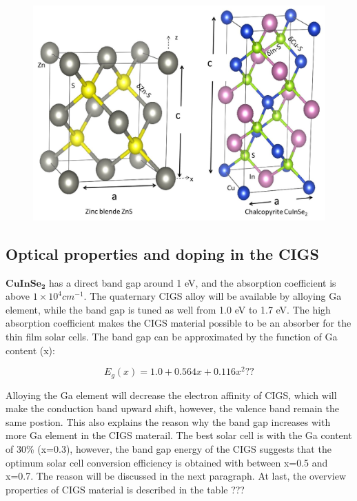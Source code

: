 \documentclass[a4paper, 12pt, titlepage,oneside,drop]{kthesis}
\begin{document}
\begin{figure}[H]
\centering
\includegraphics[scale=0.4]{structureciise1.jpg} 
\caption{}
\label{crystal_cigs}
\end{figure}






\subsection{Optical properties and doping in the CIGS}
$\mathbf {CuInSe_{2}}$ has a direct band gap around 1 eV, and the absorption coefficient is above $1 \times 10^{4} cm^{-1}$. The quaternary CIGS alloy will be available by alloying Ga element, while the band gap is tuned as well from 
1.0 eV to 1.7 eV. The high absorption coefficient makes the CIGS material possible to be an absorber for the thin film solar cells. The band gap can be approximated by the function of Ga content (x):

\begin{equation}
E_g(x) = 1.0 + 0.564x+0.116x^2 ??
\end{equation}

Alloying the Ga element will decrease the electron affinity of CIGS, which will make the conduction band upward shift, however, the valence band remain the same postion. This also explains the reason why the band gap increases with 
more Ga element in the CIGS materail. The best solar cell is with the Ga content of 30\% (x=0.3), however, the band gap energy of the CIGS suggests that the optimum solar cell conversion efficiency is obtained with between x=0.5 
and x=0.7. The reason will be discussed in the next paragraph. At last, the overview properties of CIGS material is described in the table ???
\end{document}
